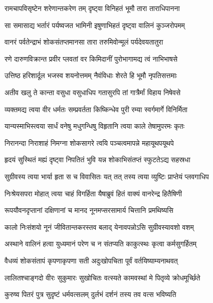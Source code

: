 
\twolineshloka
{रामचापविसृष्टेन शरेणान्तकरेण तम्}
{दृष्ट्वा विनिहतं भूमौ तारा ताराधिपानना} %

\twolineshloka
{सा समासाद्य भर्तारं पर्यष्वजत भामिनी}
{इषुणाभिहतं दृष्ट्वा वालिनं कुञ्जरोपमम्} %

\twolineshloka
{वानरं पर्वतेन्द्राभं शोकसंतप्तमानसा}
{तारा तरुमिवोन्मूलं पर्यदेवयतातुरा} %

\twolineshloka
{रणे दारुणविक्रान्त प्रवीर प्लवतां वर}
{किमिदानीं पुरोभागामद्य त्वं नाभिभाषसे} %

\twolineshloka
{उत्तिष्ठ हरिशार्दूल भजस्व शयनोत्तमम्}
{नैवंविधाः शेरते हि भूमौ नृपतिसत्तमाः} %

\twolineshloka
{अतीव खलु ते कान्ता वसुधा वसुधाधिप}
{गतासुरपि तां गात्रैर्मां विहाय निषेवसे} %

\twolineshloka
{व्यक्तमद्य त्वया वीर धर्मतः सम्प्रवर्तता}
{किष्किन्धेव पुरी रम्या स्वर्गमार्गे विनिर्मिता} %

\twolineshloka
{यान्यस्माभिस्त्वया सार्धं वनेषु मधुगन्धिषु}
{विहृतानि त्वया काले तेषामुपरमः कृतः} %

\twolineshloka
{निरानन्दा निराशाहं निमग्ना शोकसागरे}
{त्वयि पञ्चत्वमापन्ने महायूथपयूथपे} %

\twolineshloka
{हृदयं सुस्थितं मह्यं दृष्ट्वा निपतितं भुवि}
{यन्न शोकाभिसंतप्तं स्फुटतेऽद्य सहस्रधा} %

\twolineshloka
{सुग्रीवस्य त्वया भार्या हृता स च विवासितः}
{यत् तत् तस्य त्वया व्युष्टिः प्राप्तेयं प्लवगाधिप} %

\twolineshloka
{निःश्रेयसपरा मोहात् त्वया चाहं विगर्हिता}
{यैषाब्रुवं हितं वाक्यं वानरेन्द्र हितैषिणी} %

\twolineshloka
{रूपयौवनदृप्तानां दक्षिणानां च मानद}
{नूनमप्सरसामार्य चित्तानि प्रमथिष्यसि} %

\twolineshloka
{कालो निःसंशयो नूनं जीवितान्तकरस्तव}
{बलाद् येनावपन्नोऽसि सुग्रीवस्यावशो वशम्} %

\twolineshloka
{अस्थाने वालिनं हत्वा युध्यमानं परेण च}
{न संतप्यति काकुत्स्थः कृत्वा कर्मसुगर्हितम्} %

\twolineshloka
{वैधव्यं शोकसंतापं कृपणाकृपणा सती}
{अदुःखोपचिता पूर्वं वर्तयिष्याम्यनाथवत्} %

\twolineshloka
{लालितश्चाङ्गदो वीरः सुकुमारः सुखोचितः}
{वत्स्यते कामवस्थां मे पितृव्ये क्रोधमूर्च्छिते} %

\twolineshloka
{कुरुष्व पितरं पुत्र सुदृष्टं धर्मवत्सलम्}
{दुर्लभं दर्शनं तस्य तव वत्स भविष्यति} %

